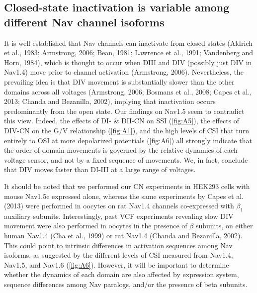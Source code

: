 \subsection{Closed-state inactivation is variable among different Nav channel isoforms}
It is well established that Nav channels can inactivate from closed states (Aldrich et al., 1983; Armstrong, 2006; Bean, 1981; Lawrence et al., 1991; Vandenberg and Horn, 1984), which is thought to occur when DIII and DIV (possibly just DIV in Nav1.4) move prior to channel activation (Armstrong, 2006). Nevertheless, the prevailing idea is that DIV movement is substantially slower than the other domains across all voltages (Armstrong, 2006; Bosmans et al., 2008; Capes et al., 2013; Chanda and Bezanilla, 2002), implying that inactivation occurs predominantly from the open state. Our findings on Nav1.5 seem to contradict this view. Indeed, the effects of DI- \& DII-CN on SSI (\autoref{fig:A5}), the effects of DIV-CN on the G/V relationship (\autoref{fig:A1}), and the high levels of CSI that turn entirely to OSI at more depolarized potentials (\autoref{fig:A6}) all strongly indicate that the order of domain movements is governed by the relative dynamics of each voltage sensor, and not by a fixed sequence of movements. We, in fact, conclude that DIV moves faster than DI-III at a large range of voltages.

It should be noted that we performed our CN experiments in HEK293 cells with mouse Nav1.5e expressed alone, whereas the same experiments by Capes et al. (2013) were performed in oocytes on rat Nav1.4 channels co-expressed with $\beta_1$ auxiliary subunits. Interestingly, past VCF experiments revealing slow DIV movement were also performed in oocytes in the presence of $\beta$ subunits, on either human Nav1.4 (Cha et al., 1999) or rat Nav1.4 (Chanda and Bezanilla, 2002). This could point to intrinsic differences in activation sequences among Nav isoforms, as suggested by the different levels of CSI measured from Nav1.4, Nav1.5, and Nav1.6 (\autoref{fig:A6}). However, it will be important to determine whether the dynamics of each domain are also affected by expression system, sequence differences among Nav paralogs, and/or the presence of beta subunits. 


